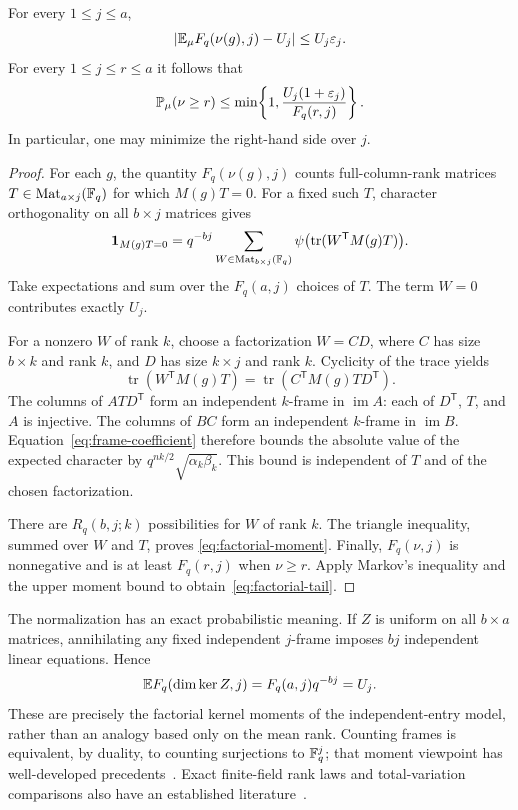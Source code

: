 \begin{theorem}
\label{thm:factorial-kernel}
For every $1\le j\le a$,
\begin{equation}
 \left|\mathbb E_\mu F_q(\nu(g),j)-U_j\right|
 \le U_j\varepsilon_j.
 \label{eq:factorial-moment}
\end{equation}
For every $1\le j\le r\le a$ it follows that
\begin{equation}
 \mathbb P_\mu(\nu\ge r)
 \le \min\!\left\{1,
       \frac{U_j(1+\varepsilon_j)}{F_q(r,j)}\right\}.
 \label{eq:factorial-tail}
\end{equation}
In particular, one may minimize the right-hand side over $j$.
\end{theorem}

\begin{proof}
For each $g$, the quantity $F_q(\nu(g),j)$ counts full-column-rank matrices
$T\in\operatorname{Mat}_{a\times j}(\mathbb F_q)$ for which $M(g)T=0$.
For a fixed such $T$, character orthogonality on all $b\times j$ matrices
gives
\[
 \boldsymbol{1}_{M(g)T=0}
 =q^{-bj}\sum_{W\in\operatorname{Mat}_{b\times j}(\mathbb F_q)}
       \psi\bigl(\operatorname{tr}(W^{\mathsf T}M(g)T)\bigr).
\]
Take expectations and sum over the $F_q(a,j)$ choices of $T$.
The term $W=0$ contributes exactly $U_j$.

For a nonzero $W$ of rank $k$, choose a factorization $W=CD$, where $C$
has size $b\times k$ and rank $k$, and $D$ has size $k\times j$ and
rank $k$. Cyclicity of the trace yields
\[
 \operatorname{tr}(W^{\mathsf T}M(g)T)
 =\operatorname{tr}(C^{\mathsf T}M(g)TD^{\mathsf T}).
\]
The columns of $ATD^{\mathsf T}$ form an independent $k$-frame in
$\operatorname{im}A$: each of $D^{\mathsf T}$, $T$, and $A$ is injective.
The columns of $BC$ form an independent $k$-frame in $\operatorname{im}B$.
Equation~\eqref{eq:frame-coefficient} therefore bounds the absolute value
of the expected character by $q^{nk/2}\sqrt{\alpha_k\beta_k}$.
This bound is independent of $T$ and of the chosen factorization.

There are $R_q(b,j;k)$ possibilities for $W$ of rank $k$.
The triangle inequality, summed over $W$ and $T$, proves
\eqref{eq:factorial-moment}. Finally, $F_q(\nu,j)$ is nonnegative and is
at least $F_q(r,j)$ when $\nu\ge r$. Apply Markov's inequality and the
upper moment bound to obtain~\eqref{eq:factorial-tail}.
\end{proof}

The normalization has an exact probabilistic meaning. If $Z$ is uniform
on all $b\times a$ matrices, annihilating any fixed independent $j$-frame
imposes $bj$ independent linear equations. Hence
\[
 \mathbb E F_q(\dim\ker Z,j)=F_q(a,j)q^{-bj}=U_j.
\]
These are precisely the factorial kernel moments of the independent-entry
model, rather than an analogy based only on the mean rank. Counting frames
is equivalent, by duality, to counting surjections to $\mathbb F_q^j$; that moment
viewpoint has well-developed precedents~\cite{wood}. Exact finite-field rank
laws and total-variation comparisons also have an established
literature~\cite{fulman}.

